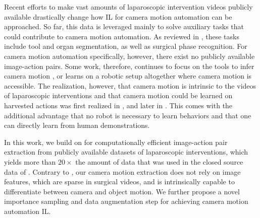 Recent efforts to make vast amounts of laparoscopic intervention videos publicly available \cite{maier2022surgical} drastically change how IL for camera motion automation can be approached. So far, this data is leveraged mainly to solve auxiliary tasks that could contribute to camera motion automation. As reviewed in \cite{loukas2018video}, these tasks include tool and organ segmentation, as well as surgical phase recognition. For camera motion automation specifically, however, there exist no publicly available image-action pairs. Some work, therefore, continues to focus on the tools to infer camera motion \cite{li2021data}, or learns on a robotic setup altogether \cite{li20223d} where camera motion is accessible. The realization, however, that camera motion is intrinsic to the videos of laparoscopic interventions and that camera motion could be learned on harvested actions was first realized in \cite{huber2022deep}, and later in \cite{li2022learning}. This comes with the additional advantage that no robot is necessary to learn behaviors and that one can directly learn from human demonstrations.

In this work, we build on \cite{huber2022deep} for computationally efficient image-action pair extraction from publicly available datasets of laparoscopic interventions, which yields more than $20\times$ the amount of data that was used in the closed source data of \cite{li2022learning}. Contrary to \cite{li2022learning}, our camera motion extraction does not rely on image features, which are sparse in surgical videos, and is intrinsically capable to differentiate between camera and object motion. We further propose a novel importance sampling and data augmentation step for achieving camera motion automation IL.








